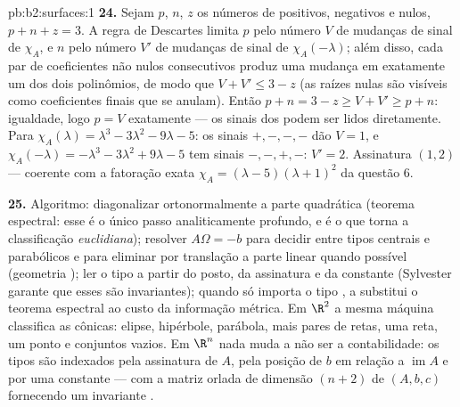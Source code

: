 \begin{solution}{pb:b2:surfaces:1}
\textbf{24.} Sejam $p$, $n$, $z$ os números de  positivos,
negativos e nulos, $p + n + z = 3$. A regra de Descartes
limita $p$ pelo número $V$ de mudanças de sinal de
$\chi_A$, e $n$ pelo número $V'$ de mudanças de sinal de
$\chi_A(-\lambda)$; além disso, cada par de coeficientes não nulos
consecutivos produz uma mudança em exatamente um dos dois
polinômios, de modo que $V + V' \leq 3 - z$ (as raízes nulas são visíveis
como coeficientes finais que se anulam). Então $p + n = 3 - z \geq
V + V' \geq p + n$: igualdade, logo $p = V$ exatamente --- os
sinais dos  podem ser lidos diretamente. Para $\chi_A(\lambda)
= \lambda^3 - 3\lambda^2 - 9\lambda - 5$: os sinais $+,-,-,-$
dão $V = 1$, e $\chi_A(-\lambda) = -\lambda^3 - 3\lambda^2
+ 9\lambda - 5$ tem sinais $-,-,+,-$: $V' = 2$. Assinatura $(1,
2)$ --- coerente com a fatoração exata $\chi_A =
(\lambda - 5)(\lambda + 1)^2$ da questão 6.

\textbf{25.} Algoritmo: diagonalizar ortonormalmente a parte
quadrática (teorema espectral: esse é o único passo
analiticamente profundo, e é o que torna a
classificação \emph{euclidiana}); resolver $A\Omega = -b$ para
decidir entre tipos centrais e parabólicos e para eliminar por translação
a parte linear quando possível (geometria ); ler o
tipo a partir do posto, da assinatura e da constante (Sylvester
garante que esses são invariantes); quando só importa o tipo
, a  substitui o teorema espectral ao
custo da informação métrica. Em $\R^2$ a mesma
máquina classifica as cônicas: elipse, hipérbole, parábola, mais
pares de retas, uma reta, um ponto e conjuntos vazios. Em $\R^n$
nada muda a não ser a contabilidade: os tipos são indexados pela
assinatura de $A$, pela posição de $b$ em relação a
$\operatorname{im}A$ e por uma constante --- com a matriz orlada de
dimensão $(n{+}2)$ de $(A, b, c)$
fornecendo um invariante .
\end{solution}
